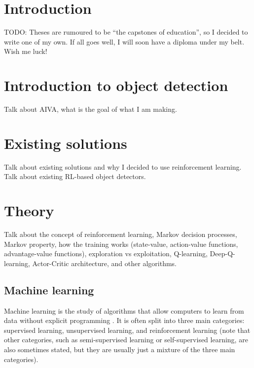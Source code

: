\documentclass[
  digital,     %
  oneside,     %
  nosansbold,  %
  nocolorbold, %
  lof,         %
  lot,         %
]{fithesis4}
\begin{document}
\chapter*{Introduction}

TODO: Theses are rumoured to be \enquote{the capstones of education}, so
I decided to write one of my own. If all goes well, I will soon
have a diploma under my belt. Wish me luck!


\chapter{Introduction to object detection}
Talk about AIVA, what is the goal of what I am making.
\chapter{Existing solutions}
Talk about existing solutions and why I decided to use reinforcement learning. Talk about existing RL-based object detectors.

\chapter{Theory}
Talk about the concept of reinforcement learning, Markov decision processes, Markov property, how the training works (state-value, action-value functions, advantage-value functions), exploration vs exploitation, Q-learning, Deep-Q-learning, Actor-Critic architecture, and other algorithms. 

\section{Machine learning}
Machine learning is the study of algorithms that allow computers to learn from data without explicit programming \cite[p. 5]{IB031}. It is often split into three main categories: supervised learning, unsupervised learning, and reinforcement learning (note that other categories, such as semi-supervised learning or self-supervised learning, are also sometimes stated, but they are usually just a mixture of the three main categories).
\end{document}

